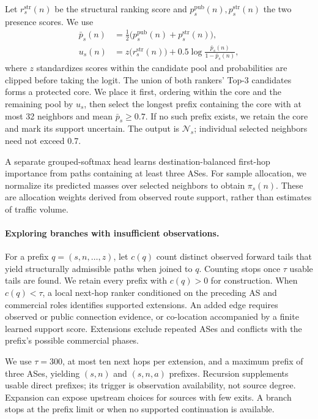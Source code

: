 Let $r_s^{\mathrm{str}}(n)$ be the structural ranking score and
$p_s^{\mathrm{pub}}(n),p_s^{\mathrm{str}}(n)$ the two presence scores. We use
\begin{equation}
\begin{split}
\bar p_s(n)&=\tfrac12\bigl(p_s^{\mathrm{pub}}(n)+p_s^{\mathrm{str}}(n)\bigr),\\
u_s(n)&=z\bigl(r_s^{\mathrm{str}}(n)\bigr)
          +0.5\log\frac{\bar p_s(n)}{1-\bar p_s(n)},
\end{split}
\label{eq:neighbor_ranking}
\end{equation}
where $z$ standardizes scores within the candidate pool and probabilities
are clipped before taking the logit. The union of both rankers' Top-3
candidates forms a protected core. We place it first, ordering within the
core and the remaining pool by $u_s$, then select the longest prefix
containing the core with at most 32 neighbors and mean $\bar p_s\geq0.7$.
If no such prefix exists, we retain the core and mark its support uncertain.
The output is $\mathcal N_s$; individual selected neighbors need not exceed
0.7.

A separate grouped-softmax head learns destination-balanced first-hop
importance from paths containing at least three ASes. For sample
allocation, we normalize its predicted masses over selected neighbors to
obtain $\pi_s(n)$. These are allocation weights derived from observed route
support, rather than estimates of traffic volume.

\paragraph{Exploring branches with insufficient observations.}
For a prefix $q=(s,n,\ldots,z)$, let $c(q)$ count distinct observed forward
tails that yield structurally admissible paths when joined to $q$.
Counting stops once $\tau$ usable tails are found. We retain every prefix
with $c(q)>0$ for construction. When $c(q)<\tau$, a local next-hop ranker
conditioned on the preceding AS and commercial roles identifies supported
extensions. An added edge requires observed or public connection evidence,
or co-location accompanied by a finite learned support score. Extensions
exclude repeated ASes and conflicts with the prefix's possible commercial
phases.

We use $\tau=300$, at most ten next hops per extension, and a maximum prefix
of three ASes, yielding $(s,n)$ and $(s,n,a)$ prefixes. Recursion supplements
usable direct prefixes; its trigger is observation availability, not source
degree. Expansion can expose upstream choices for sources with few exits.
A branch stops
at the prefix limit or when no supported continuation is available.

